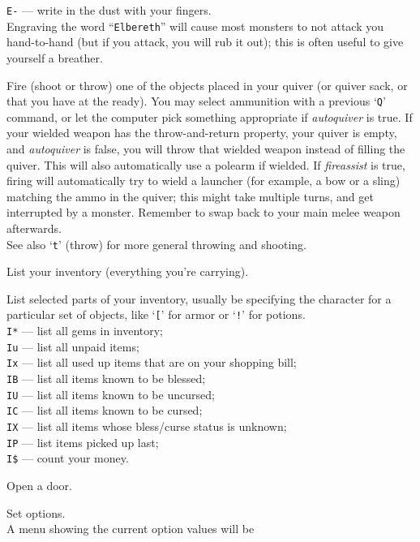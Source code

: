 {\tt E-} --- write in the dust with your fingers.\\
Engraving the word ``{\tt Elbereth}'' will cause most monsters to not attack
you hand-to-hand (but if you attack, you will rub it out); this is
often useful to give yourself a breather.
\item[\tb{f}]
Fire (shoot or throw) one of the objects placed in your quiver (or
quiver sack, or that you have at the ready).
You may select ammunition with a previous `{\tt Q}' command, or let the
computer pick something appropriate if {\it autoquiver\/} is true.
If your wielded weapon has the throw-and-return property, your quiver
is empty, and {\it autoquiver\/}
is false, you will throw that wielded weapon instead of filling the quiver.
This will also automatically use a polearm if wielded.
If {\it fireassist\/} is true, firing will automatically try to wield a launcher
(for example, a bow or a sling) matching the ammo in the quiver; this might
take multiple turns, and get interrupted by a monster.
Remember to swap back to your main melee weapon afterwards.
\\
See also `{\tt t}' (throw) for more general throwing and shooting.
\item[\tb{i}]
List your inventory (everything you're carrying).
\item[\tb{I}]
List selected parts of your inventory, usually be specifying the character
for a particular set of objects, like `{\tt [}' for armor or `{\tt !}'
for potions.\\
{\tt I*} --- list all gems in inventory;\\
{\tt Iu} --- list all unpaid items;\\
{\tt Ix} --- list all used up items that are on your shopping bill;\\
{\tt IB} --- list all items known to be blessed;\\
{\tt IU} --- list all items known to be uncursed;\\
{\tt IC} --- list all items known to be cursed;\\
{\tt IX} --- list all items whose bless/curse status is unknown;\\
{\tt IP} --- list items picked up last;\\
{\tt I\$} --- count your money.
\item[\tb{o}]
Open a door.
\item[\tb{O}]
Set options.\\
A menu showing the current option values will be
